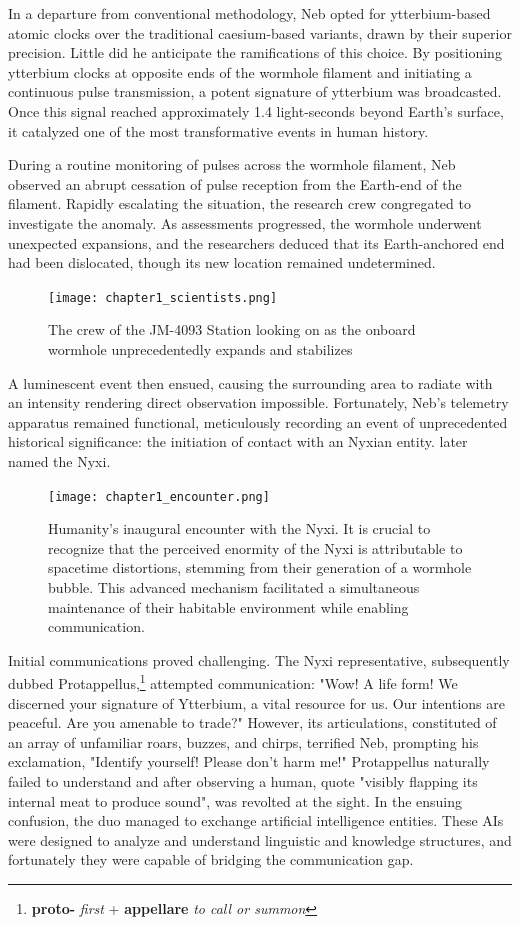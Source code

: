In a departure from conventional methodology, Neb opted for ytterbium-based
atomic clocks over the traditional caesium-based variants, drawn by their
superior precision. Little did he anticipate the ramifications of this choice.
By positioning ytterbium clocks at opposite ends of the wormhole filament and
initiating a continuous pulse transmission, a potent signature of ytterbium was
broadcasted. Once this signal reached approximately 1.4 light-seconds beyond
Earth's surface, it catalyzed one of the most transformative events in human
history.

During a routine monitoring of pulses across the wormhole filament, Neb
observed an abrupt cessation of pulse reception from the Earth-end of the
filament. Rapidly escalating the situation, the research crew congregated to
investigate the anomaly. As assessments progressed, the wormhole underwent
unexpected expansions, and the researchers deduced that its Earth-anchored end
had been dislocated, though its new location remained undetermined.

\begin{figure}[h]
	\centering\texttt{[image: chapter1\_scientists.png]}
	\caption{The crew of the JM-4093 Station looking on as the onboard wormhole unprecedentedly expands and stabilizes}
\end{figure}

A luminescent event then ensued, causing the surrounding area to radiate with
an intensity rendering direct observation impossible. Fortunately, Neb's
telemetry apparatus remained functional, meticulously recording an event of
unprecedented historical significance: the initiation of contact with an Nyxian
entity. later named the Nyxi.

\begin{figure}[h]
	\centering\texttt{[image: chapter1\_encounter.png]}
	\caption{Humanity's inaugural encounter with the Nyxi. It is crucial to recognize that
		the perceived enormity of the Nyxi is attributable to spacetime distortions,
		stemming from their generation of a wormhole bubble. This advanced mechanism
		facilitated a simultaneous maintenance of their habitable environment while
		enabling communication.}
\end{figure}

Initial communications proved challenging. The Nyxi representative,
subsequently dubbed Protappellus,\footnote{\textbf{proto-} \textit{first} +
	\textbf{appellare} \textit{to call or summon}} attempted communication: "Wow! A
life form! We discerned your signature of Ytterbium, a vital resource for us.
Our intentions are peaceful. Are you amenable to trade?" However, its
articulations, constituted of an array of unfamiliar roars, buzzes, and chirps,
terrified Neb, prompting his exclamation, "Identify yourself! Please don't harm
me!" Protappellus naturally failed to understand and after observing a human,
quote "visibly flapping its internal meat to produce sound", was revolted at
the sight. In the ensuing confusion, the duo managed to exchange artificial
intelligence entities. These AIs were designed to analyze and understand
linguistic and knowledge structures, and fortunately they were capable of
bridging the communication gap.

